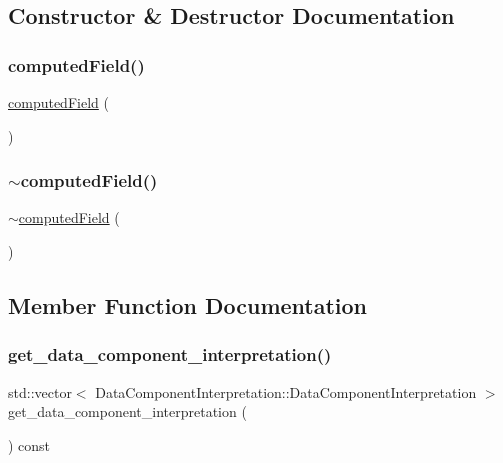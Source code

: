 \subsection{Constructor \& Destructor Documentation}
\mbox{\label{classcomputed_field_ab4f4245d1d8abf1daeedbf2784d6c42a}} 
\subsubsection{\texorpdfstring{computed\+Field()}{computedField()}}
{\footnotesize\ttfamily \mbox{\hyperlink{classcomputed_field}{computed\+Field}} (\begin{DoxyParamCaption}{ }\end{DoxyParamCaption})}

\mbox{\label{classcomputed_field_a23cfaecc3df333ef21739f65a72c81ff}} 
\subsubsection{\texorpdfstring{$\sim$computed\+Field()}{~computedField()}}
{\footnotesize\ttfamily $\sim$\mbox{\hyperlink{classcomputed_field}{computed\+Field}} (\begin{DoxyParamCaption}{ }\end{DoxyParamCaption})}



\subsection{Member Function Documentation}
\mbox{\label{classcomputed_field_a3a7ceb57bada784f078912268a0774a7}} 
\subsubsection{\texorpdfstring{get\+\_\+data\+\_\+component\+\_\+interpretation()}{get\_data\_component\_interpretation()}}
{\footnotesize\ttfamily std\+::vector$<$ Data\+Component\+Interpretation\+::\+Data\+Component\+Interpretation $>$ get\+\_\+data\+\_\+component\+\_\+interpretation (\begin{DoxyParamCaption}{ }\end{DoxyParamCaption}) const}

